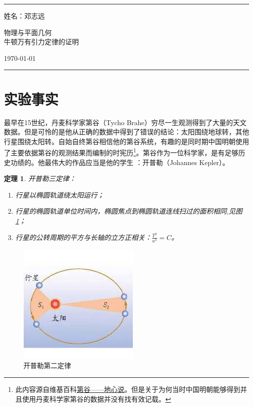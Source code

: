 \documentclass[a4paper]{article}
\newtheorem{theorem}{定理}
\begin{document}

\fancyhead[C]{}
\hrule \medskip %
\begin{minipage}{0.295\textwidth} 
\raggedright
\footnotesize
姓名：邓志远 \\   
 
\end{minipage}
\begin{minipage}{0.4\textwidth} 
\centering 
\large 
物理与平面几何\\ 
\normalsize 
牛顿万有引力定律的证明\\ 
\end{minipage}
\begin{minipage}{0.295\textwidth} 
\raggedleft
\today\hfill\\
\end{minipage}
\medskip\hrule 
\bigskip

\renewcommand{\contentsname}{目录}
\tableofcontents

\section{实验事实}
最早在15世纪，丹麦科学家第谷（Tycho Brahe）穷尽一生观测得到了大量的天文数据。但是可怜的是他从正确的数据中得到了错误的结论：太阳围绕地球转，其他行星围绕太阳转。自始自终第谷相信他的第谷系统，有趣的是同时期中国明朝使用了主要依据第谷的观测结果而编制的时宪历\footnote{此内容源自维基百科\href{https://zh.wikipedia.org/wiki/第谷·布拉赫}{第谷——地心说}。但是关于为何当时中国明朝能够得到并且使用丹麦科学家第谷的数据并没有找有效记载。}。第谷作为一位科学家，是有足够历史功绩的。他最伟大的作品应当是他的学生 ：开普勒（Johannes Kepler）。

\begin{theorem}
开普勒三定律：
\begin{enumerate}
    \item 行星以椭圆轨道绕太阳运行；
    \item 行星的椭圆轨道单位时间内，椭圆焦点到椭圆轨道连线扫过的面积相同,见图\ref{kepler2}；
    \item 行星的公转周期的平方与长轴的立方正相关：$\frac{T^{2}}{a^{3}}=C$。
\end{enumerate}
\end{theorem}

    \begin{figure}[htp]
        \centering
        \includegraphics{kepler2.jpg}
        \caption{开普勒第二定律}
        \label{kepler2}
    \end{figure}
\end{document}
